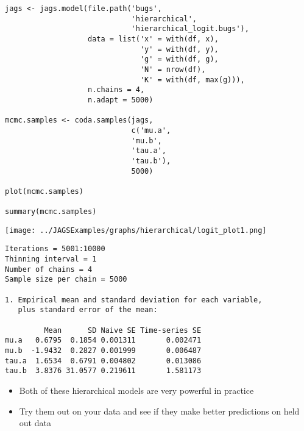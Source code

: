 \documentclass{beamer}
\begin{document}
\begin{frame}[fragile]
  \begin{verbatim}
jags <- jags.model(file.path('bugs',
                             'hierarchical',
                             'hierarchical_logit.bugs'),
                   data = list('x' = with(df, x),
                               'y' = with(df, y),
                               'g' = with(df, g),
                               'N' = nrow(df),
                               'K' = with(df, max(g))),
                   n.chains = 4,
                   n.adapt = 5000)

mcmc.samples <- coda.samples(jags,
                             c('mu.a',
                             'mu.b',
                             'tau.a',
                             'tau.b'),
                             5000)

plot(mcmc.samples)

summary(mcmc.samples)
  \end{verbatim}
\end{frame}

\begin{frame}[fragile]
  \begin{center}
    \texttt{[image: ../JAGSExamples/graphs/hierarchical/logit\_plot1.png]}
  \end{center}
\end{frame}

\begin{frame}[fragile]
  \begin{verbatim}
Iterations = 5001:10000
Thinning interval = 1 
Number of chains = 4 
Sample size per chain = 5000 

1. Empirical mean and standard deviation for each variable,
   plus standard error of the mean:

         Mean      SD Naive SE Time-series SE
mu.a   0.6795  0.1854 0.001311       0.002471
mu.b  -1.9432  0.2827 0.001999       0.006487
tau.a  1.6534  0.6791 0.004802       0.013086
tau.b  3.8376 31.0577 0.219611       1.581173
  \end{verbatim}
\end{frame}

\begin{frame}[fragile]
  \begin{itemize}
    \item{Both of these hierarchical models are very powerful in practice}
    \item{Try them out on your data and see if they make better predictions on held out data}
  \end{itemize}
\end{frame}
\end{document}

